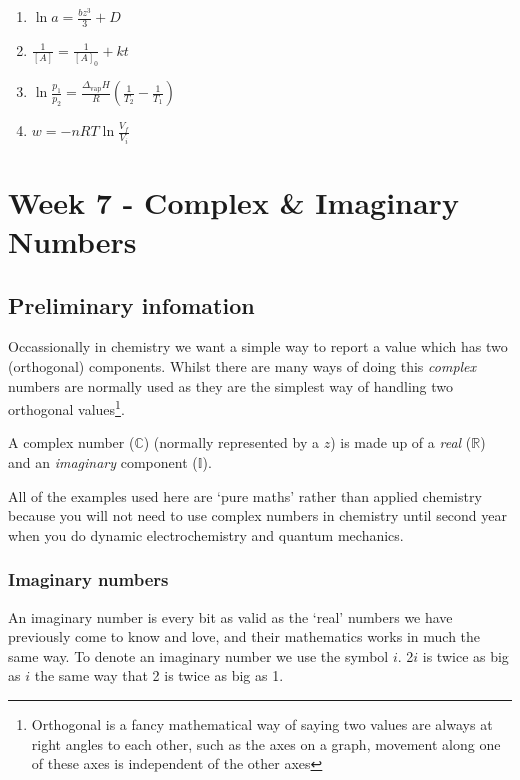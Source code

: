 \documentclass[
]{book}
\providecommand{\tightlist}{%
  \setlength{\itemsep}{0pt}\setlength{\parskip}{0pt}}
\begin{document}
\begin{enumerate}
\def\labelenumi{\arabic{enumi}.}
\tightlist
\item
  \(\ln a = \frac{bz^3}{3}+D\)
\item
  \(\frac{1}{[A]}=\frac{1}{[A]_0}+ kt\)
\item
  \(\ln \frac{p_1}{p_2}=\frac{\Delta_{\textrm{vap}}H}{R}\left({\frac{1}{T_2}-\frac{1}{T_1}}\right)\)
\item
  \(w = -nRT \ln \frac{V_f}{V_i}\)
\end{enumerate}

\hypertarget{ch:Workshop7}{%
\chapter{Week 7 - Complex \& Imaginary Numbers}\label{ch:Workshop7}}

\hypertarget{sec:Prelim7}{%
\section{Preliminary infomation}\label{sec:Prelim7}}

Occassionally in chemistry we want a simple way to report a value which has two (orthogonal) components. Whilst there are many ways of doing this \emph{complex} numbers are normally used as they are the simplest way of handling two orthogonal values\footnote{Orthogonal is a fancy mathematical way of saying two values are always at right angles to each other, such as the axes on a graph, movement along one of these axes is independent of the other axes}.

A complex number (\(\mathbb{C}\)) (normally represented by a \(z\)) is made up of a \emph{real} (\(\mathbb{R}\)) and an \emph{imaginary} component (\(\mathbb{I}\)).

All of the examples used here are `pure maths' rather than applied chemistry because you will not need to use complex numbers in chemistry until second year when you do dynamic electrochemistry and quantum mechanics.

\hypertarget{imaginary-numbers}{%
\subsection{Imaginary numbers}\label{imaginary-numbers}}

An imaginary number is every bit as valid as the `real' numbers we have previously come to know and love, and their mathematics works in much the same way. To denote an imaginary number we use the symbol \(i\). 2\(i\) is twice as big as \(i\) the same way that 2 is twice as big as 1.
\end{document}
